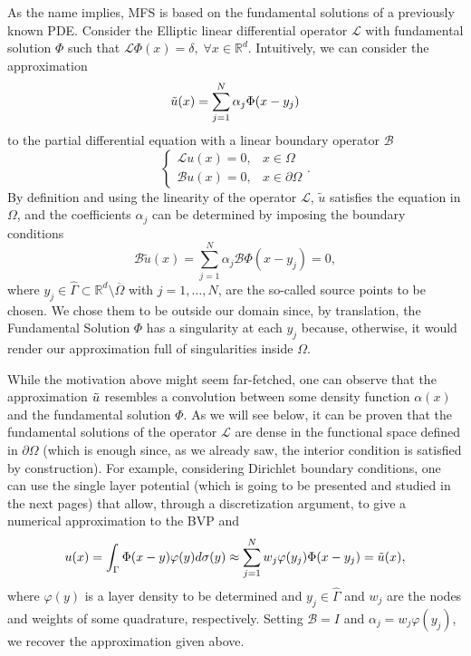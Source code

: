 As the name implies, \ac{MFS} is based on the fundamental solutions of a previously known \ac{PDE}. Consider the Elliptic linear differential operator \(\mathcal{L}\) with fundamental solution \(\Phi\) such that \(\mathcal{L}\Phi(x) = \delta, \; \forall x \in \mathbb{R}^d\). Intuitively, we can consider the approximation
\[
\Tilde{u}(x) = \sum_{j=1}^{N}\alpha_j \Phi(x-y_j)
\]
to the partial differential equation with a linear boundary operator \(\mathcal{B}\)
\[
\begin{cases}
    \mathcal{L}u(x) = 0,  & x \in \Omega\\
    \mathcal{B}u(x) = 0,  & x \in \partial\Omega
\end{cases}. 
\]
By definition and using the linearity of the operator \(\mathcal{L}\), \(\tilde{u}\) satisfies the equation in \(\Omega\), and the coefficients \(\alpha_j\) can be determined by imposing the boundary conditions
\[
    \mathcal{B}\tilde{u}(x)=\sum_{j=1}^{N}\alpha_j \mathcal{B}\Phi(x-y_j)=0,
\]
where \(y_j \in \hat{\Gamma} \subset \mathbb{R}^d\setminus \overline{\Omega}\) with \(j=1,\dots,N\), are the so-called source points to be chosen. We chose them to be outside our domain since, by translation, the Fundamental Solution \(\Phi\) has a singularity at each \(y_j\) because, otherwise, it would render our approximation full of singularities inside \(\Omega\). 
\begin{remark}
    While the motivation above might seem far-fetched, one can observe that the approximation \(\Tilde{u}\) resembles a convolution between some density function \(\alpha(x)\) and the fundamental solution \(\Phi\). As we will see below, it can be proven that the fundamental solutions of the operator \(\mathcal{L}\) are dense in the functional space defined in \(\partial\Omega\) (which is enough since, as we already saw, the interior condition is satisfied by construction). For example, considering Dirichlet boundary conditions, one can use the single layer potential (which is going to be presented and studied in the next pages) that allow, through a discretization argument, to give a numerical approximation to the \ac{BVP} and
    \begin{equation}\label{MFS_approx_disc}
        u(x) = \int_{\Gamma}\Phi(x-y)\varphi(y)d\sigma(y) \approx \sum_{j=1}^{N}w_j \varphi(y_j) \Phi(x-y_j) = \Tilde{u}(x), 
    \end{equation}
    where \(\varphi(y)\) is a layer density to be determined and \(y_j \in \hat{\Gamma}\) and \(w_j\) are the nodes and weights of some quadrature, respectively. Setting \(\mathcal{B} = I\) and \(\alpha_j = w_j \varphi(y_j)\), we recover the approximation given above.
\end{remark}
